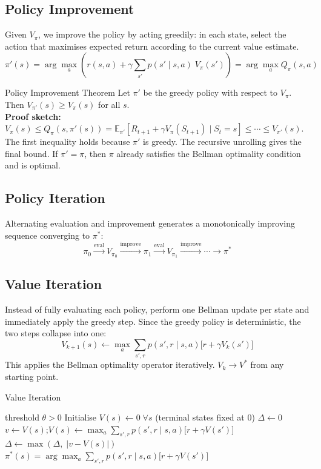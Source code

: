 \documentclass[11pt,a4paper]{article}
\newcommand{\E}{\mathbb{E}}
\begin{document}
\subsection{Policy Improvement}

Given $V_\pi$, we improve the policy by acting greedily: in each state, select the action that maximises expected return according to the current value estimate.
\[
\pi'(s) = \arg\max_a \!\left( r(s,a) + \gamma \sum_{s'} p(s'\mid s,a)\; V_\pi(s') \right) = \arg\max_a Q_\pi(s,a)
\]

\begin{thmbox}{Policy Improvement Theorem}
Let $\pi'$ be the greedy policy with respect to $V_\pi$. Then $V_{\pi'}(s) \geq V_\pi(s)$ for all $s$.\\[4pt]
\textbf{Proof sketch:} $V_\pi(s) \leq Q_\pi(s, \pi'(s)) = \E_{\pi'}[R_{t+1} + \gamma V_\pi(S_{t+1})\mid S_t=s] \leq \cdots \leq V_{\pi'}(s)$.\\
The first inequality holds because $\pi'$ is greedy. The recursive unrolling gives the final bound. If $\pi' = \pi$, then $\pi$ already satisfies the Bellman optimality condition and is optimal.
\end{thmbox}

\subsection{Policy Iteration}

Alternating evaluation and improvement generates a monotonically improving sequence converging to $\pi^*$:
\[
\pi_0 \xrightarrow{\text{eval}} V_{\pi_0} \xrightarrow{\text{improve}} \pi_1 \xrightarrow{\text{eval}} V_{\pi_1} \xrightarrow{\text{improve}} \cdots \to \pi^*
\]

\subsection{Value Iteration}

Instead of fully evaluating each policy, perform one Bellman update per state and immediately apply the greedy step. Since the greedy policy is deterministic, the two steps collapse into one:
\[
V_{k+1}(s) \leftarrow \max_a \sum_{s',r} p(s',r\mid s,a)\bigl[r + \gamma V_k(s')\bigr]
\]
This applies the Bellman optimality operator iteratively. $V_k \to V^*$ from any starting point.

\begin{algobox}{Value Iteration}
\begin{algorithmic}[1]
\Require threshold $\theta > 0$
\State Initialise $V(s) \leftarrow 0\;\forall s$ (terminal states fixed at $0$)
\Repeat
  \State $\Delta \leftarrow 0$
    \State $v \leftarrow V(s)$;\quad $V(s) \leftarrow \max_a \displaystyle\sum_{s',r} p(s',r\mid s,a)\bigl[r+\gamma V(s')\bigr]$
    \State $\Delta \leftarrow \max(\Delta,\;|v-V(s)|)$
  \EndFor
\Until{$\Delta < \theta$}
\Ensure $\pi^*(s) = \arg\max_a \displaystyle\sum_{s',r} p(s',r\mid s,a)\bigl[r+\gamma V(s')\bigr]$
\end{algorithmic}
\end{algobox}
\end{document}

